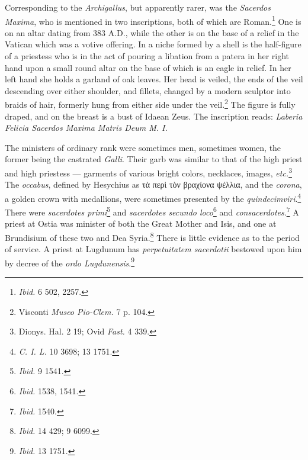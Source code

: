 \documentclass[a4paper, 11pt, oneside, polutonikogreek, english]{article}
\begin{document}
Corresponding to the \emph{Archigallus}, but apparently rarer, was the \emph{Sacerdos Maxima}, who is mentioned in two inscriptions, both of which are Roman.\footnote{\emph{Ibid.} 6 502, 2257.} One is on an altar dating from 383 \textsc{A.D.}, while the other is on the base of a relief in the Vatican which was a votive offering. In a niche formed by a shell is the half-figure of a priestess who is in the act of pouring a libation from a patera in her right hand upon a small round altar on the base of which is an eagle in relief. In her left hand she holds a garland of oak leaves. Her head is veiled, the ends of the veil descending over either shoulder, and fillets, changed by a modern sculptor into braids of hair, formerly hung from either side under the veil.\footnote{Visconti \emph{Museo Pio-Clem.} 7 p. 104.} The figure is fully draped, and on the breast is a bust of Idaean Zeus. The inscription reads: \emph{Laberia Felicia Sacerdos Maxima Matris Deum M. I.}

The ministers of ordinary rank were sometimes men, sometimes women, the former being the castrated \emph{Galli}. Their garb was similar to that of the high priest and high priestess --- garments of various bright colors, necklaces, images, \emph{etc.}\footnote{Dionys. Hal. 2 19; Ovid \emph{Fast.} 4 339.} The \emph{occabus}, defined by Hesychius as τὰ περὶ τὸν βραχίονα ψέλλια, and the \emph{corona}, a golden crown with medallions, were sometimes presented by the \emph{quindecimviri}.\footnote{\emph{C. I. L.} 10 3698; 13 1751.} There were \emph{sacerdotes primi}\footnote{\emph{Ibid.} 9 1541.} and \emph{sacerdotes secundo loco}\footnote{\emph{Ibid.} 1538, 1541.} and \emph{consacerdotes}.\footnote{\emph{Ibid.} 1540.} A priest at Ostia was minister of both the Great Mother and Isis, and one at Brundisium of these two and Dea Syria.\footnote{\emph{Ibid.} 14 429; 9 6099.} There is little evidence as to the period of service. A priest at Lugdunum has \emph{perpetuitatem sacerdotii} bestowed upon him by decree of the \emph{ordo Lugdunensis}.\footnote{\emph{Ibid.} 13 1751.}
\end{document}
